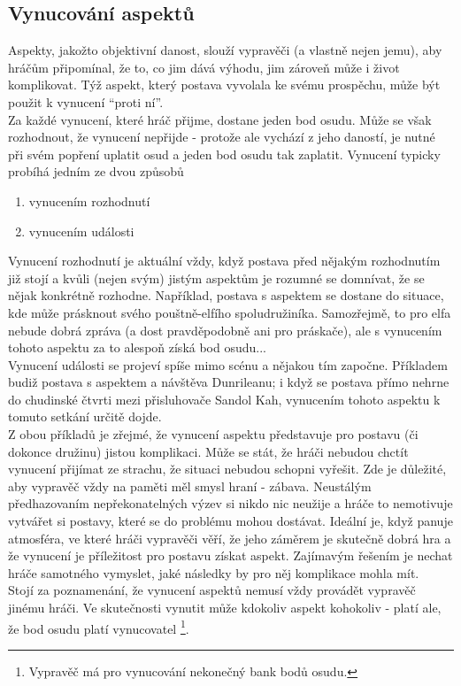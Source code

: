 \documentclass[../main.tex]{subfiles}
\begin{document}
\subsection{Vynucování aspektů}
\label{sec:vynucovani-aspektu}

Aspekty, jakožto objektivní danost, slouží vypravěči (a vlastně nejen jemu), aby hráčům připomínal, že to, co jim dává výhodu, jim zároveň může i život komplikovat. Týž aspekt, který postava vyvolala ke svému prospěchu, může být použit k vynucení ``proti ní''.\\
Za každé vynucení, které hráč přijme, dostane jeden bod osudu. Může se však rozhodnout, že vynucení nepřijde - protože ale vychází z jeho daností, je nutné při svém popření uplatit osud a jeden bod osudu tak zaplatit. Vynucení typicky probíhá jedním ze dvou způsobů

\begin{enumerate}
\item vynucením rozhodnutí
\item vynucením události
\end{enumerate}

Vynucení rozhodnutí je aktuální vždy, když postava před nějakým rozhodnutím již stojí a kvůli (nejen svým) jistým aspektům je rozumné se domnívat, že se nějak konkrétně rozhodne. Například, postava s aspektem  se dostane do situace, kde může prásknout svého pouštně-elfího spoludružiníka. Samozřejmě, to pro elfa nebude dobrá zpráva (a dost pravděpodobně ani pro práskače), ale s vynucením tohoto aspektu za to alespoň získá bod osudu...\\
Vynucení události se projeví spíše mimo scénu a nějakou tím započne. Příkladem budiž postava s aspektem  a návštěva Dunrileanu; i když se postava přímo nehrne do chudinské čtvrti mezi přisluhovače Sandol Kah, vynucením tohoto aspektu k tomuto setkání určitě dojde.\\

Z obou příkladů je zřejmé, že vynucení aspektu představuje pro postavu (či dokonce družinu) jistou komplikaci. Může se stát, že hráči nebudou chctít vynucení přijímat ze strachu, že situaci nebudou schopni vyřešit. Zde je důležité, aby vypravěč vždy na paměti měl smysl hraní - zábava. Neustálým předhazovaním nepřekonatelných výzev si nikdo nic neužije a hráče to nemotivuje vytvářet si postavy, které se do problému mohou dostávat. Ideální je, když panuje atmosféra, ve které hráči vypravěči věří, že jeho záměrem je skutečně dobrá hra a že vynucení je příležitost pro postavu získat aspekt. Zajímavým řešením je nechat hráče samotného vymyslet, jaké následky by pro něj komplikace mohla mít.\\


Stojí za poznamenání, že vynucení aspektů nemusí vždy provádět vypravěč jinému hráči. Ve skutečnosti vynutit může kdokoliv aspekt kohokoliv - platí ale, že bod osudu platí vynucovatel \footnote{Vypravěč má pro vynucování nekonečný bank bodů osudu.}. 
\end{document}
